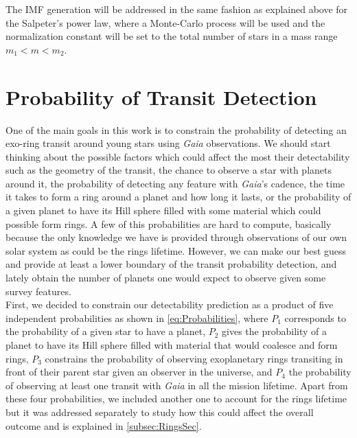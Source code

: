 The IMF generation will be addressed in the same fashion as explained above for the Salpeter's power law, where a Monte-Carlo process will be used and the normalization constant will be set to the total number of stars in a mass range $m_1 < m < m_2$. 

\section{Probability of Transit Detection}\label{sec:DetectionProbability}


One of the main goals in this work is to constrain the probability of detecting an exo-ring transit around young stars using \textit{Gaia} observations. We should start thinking about the possible factors which could affect the most their detectability such as the geometry of the transit, the chance to observe a star with planets around it, the probability of detecting any feature with \textit{Gaia}'s cadence, the time it takes to form a ring around a planet and how long it lasts, or the probability of a given planet to have its Hill sphere filled with some material which could possible form rings. A few of this probabilities are hard to compute, basically because the only knowledge we have is provided through observations of our own solar system as could be the rings lifetime. However, we can make our best guess and provide at least a lower boundary of the transit probability detection, and lately obtain the number of planets one would expect to observe given some survey features.\\

First, we decided to constrain our detectability prediction as a product of five independent probabilities  as shown in \autoref{eq:Probabilities}, where $P_1$ corresponds to the probability of a given star to have a planet, $P_2$ gives the probability of a planet to have its Hill sphere filled with material that would coalesce and form rings, $P_3$ constrains the probability of observing exoplanetary rings transiting in front of their parent star given an observer in the universe, and $P_4$ the probability of observing at least one transit with \textit{Gaia} in all the mission lifetime. Apart from these four probabilities, we included another one to account for the rings lifetime but it was addressed separately to study how this could affect the overall outcome and is explained in \autoref{subsec:RingsSec}.\\

